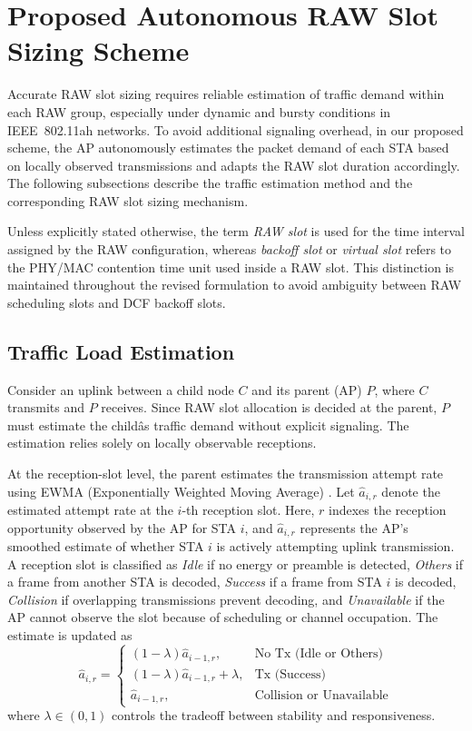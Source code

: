 \documentclass[journal]{IEEEtran}
\newcommand{\rev}[1]{{\color{blue}#1}}
\begin{document}
\section{Proposed Autonomous RAW Slot Sizing Scheme}
Accurate RAW slot sizing requires reliable estimation of traffic demand within each RAW group, especially under dynamic and bursty conditions in IEEE~802.11ah networks. To avoid additional signaling overhead, in our proposed scheme, the AP autonomously estimates the packet demand of each STA based on locally observed transmissions and adapts the RAW slot duration accordingly. The following subsections describe the traffic estimation method and the corresponding RAW slot sizing mechanism.

\begingroup\color{blue}
Unless explicitly stated otherwise, the term \emph{RAW slot} is used for the time interval assigned by the RAW configuration, whereas \emph{backoff slot} or \emph{virtual slot} refers to the PHY/MAC contention time unit used inside a RAW slot. This distinction is maintained throughout the revised formulation to avoid ambiguity between RAW scheduling slots and DCF backoff slots.
\endgroup

\subsection{Traffic Load Estimation}

Consider an uplink between a child node $C$ and its parent (AP) $P$, where $C$ transmits and $P$ receives. Since RAW slot allocation is decided at the parent, $P$ must estimate the child\^{a}s traffic demand without explicit signaling. The estimation relies solely on locally observable receptions.

At the \rev{reception-slot} level, the parent estimates the transmission attempt rate using EWMA (Exponentially Weighted Moving Average) \rev{\cite{Roberts1959EWMA}}. Let $\hat{a}_{i,r}$ denote the estimated attempt rate at the $i$-th reception slot. \rev{Here, $r$ indexes the reception opportunity observed by the AP for STA $i$, and $\hat{a}_{i,r}$ represents the AP's smoothed estimate of whether STA $i$ is actively attempting uplink transmission. A reception slot is classified as \emph{Idle} if no energy or preamble is detected, \emph{Others} if a frame from another STA is decoded, \emph{Success} if a frame from STA $i$ is decoded, \emph{Collision} if overlapping transmissions prevent decoding, and \emph{Unavailable} if the AP cannot observe the slot because of scheduling or channel occupation.} The estimate is updated as
\begin{equation}
\hat{a}_{i,r} =
\begin{cases}
(1-\lambda)\hat{a}_{i-1,r}, & \text{No Tx (Idle or Others)} \\[4pt]
(1-\lambda)\hat{a}_{i-1,r} + \lambda, & \text{Tx (Success)} \\[4pt]
\hat{a}_{i-1,r}, & \text{Collision or Unavailable}
\end{cases}
\label{eq:attempt_ewma}
\end{equation}
where $\lambda \in (0,1)$ controls the tradeoff between stability and responsiveness.
\end{document}
